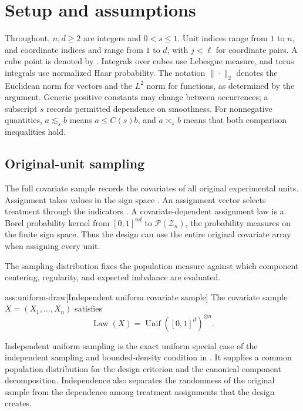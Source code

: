 \documentclass[11pt]{article}
\begin{document}
\section{Setup and assumptions}

Throughout, \(n,d\geq2\) are integers and \(0<s\leq1\). Unit indices  range from \(1\) to \(n\), and coordinate indices  and  range from \(1\) to \(d\), with \(j<\ell\) for coordinate pairs. A cube point is denoted by . Integrals over cubes use Lebesgue measure, and torus integrals use normalized Haar probability. The notation \(\|\cdot\|_2\) denotes the Euclidean norm for vectors and the \(L^2\) norm for functions, as determined by the argument. Generic positive constants may change between occurrences; a subscript \(s\) records permitted dependence on smoothness. For nonnegative quantities, \(a\lesssim_s b\) means \(a\leq C(s)b\), and \(a\asymp_s b\) means that both comparison inequalities hold.

\subsection{Original-unit sampling}

The full covariate sample  records the covariates of all original experimental units. Assignment takes values in the sign space . An assignment vector  selects treatment through the indicators . A covariate-dependent assignment law  is a Borel probability kernel from \([0,1]^{nd}\) to \(\mathcal P(\mathcal Z_n)\), the probability measures on the finite sign space. Thus the design can use the entire original covariate array when assigning every unit.

The sampling distribution fixes the population measure against which component centering, regularity, and expected imbalance are evaluated.

\begin{assumptionv}{ass:uniform-draw}[Independent uniform covariate sample]
The covariate sample \(X=(X_1,\ldots,X_n)\) satisfies
\[
\operatorname{Law}(X)=\operatorname{Unif}([0,1]^d)^{\otimes n}.
\]
\end{assumptionv}

Independent uniform sampling is the exact uniform special case of the independent sampling and bounded-density condition in \citep[Assumption 2.1]{Cytrynbaum2026Limits}. It supplies a common population distribution for the design criterion and the canonical component decomposition. Independence also separates the randomness of the original sample from the dependence among treatment assignments that the design creates.
\end{document}

